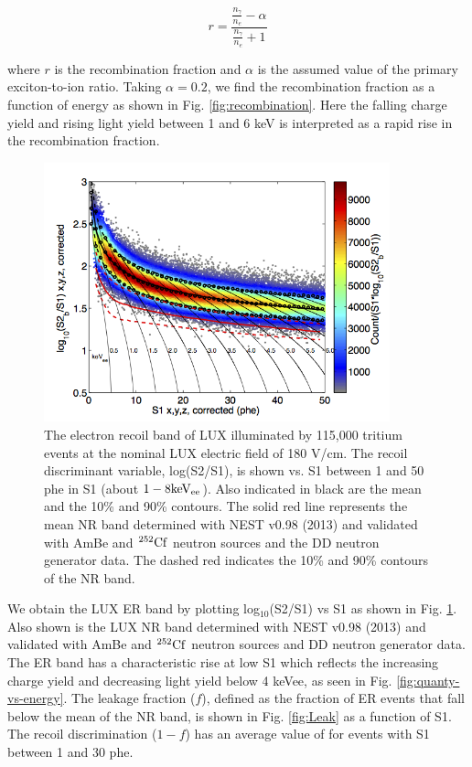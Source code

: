 \begin{displaymath}
r = \frac{\frac{n_{\gamma}}{n_e} - \alpha}{\frac{n_{\gamma}}{n_e} + 1}
\end{displaymath}

\noindent
where $r$ is the recombination fraction and $\alpha$ is the assumed value of the primary exciton-to-ion ratio. Taking $\alpha = 0.2$, we find the recombination fraction as a function of energy as shown in Fig. \ref{fig:recombination}. Here the falling charge yield and rising light yield between 1 and 6 keV is interpreted as a rapid rise in the recombination fraction. 


\begin{figure}[h!]\centering
\includegraphics[width=100mm]{fig/CH3T_fid_50_2_Dec_Tritium_Approval_Plots.png}
\caption{The electron recoil band of LUX illuminated by 115,000 tritium events at the nominal LUX electric field of 180 V/cm.  The recoil discriminant variable, log(S2/S1), is shown vs. S1 between 1 and 50 phe in S1 (about $\rm1-8 keV_{ee}$). Also indicated in black are the mean and the 10\% and 90\% contours. The solid red line represents the mean NR band determined with NEST v0.98 (2013) \cite{nest} and validated with AmBe and $\rm^{252}Cf$ neutron sources and the DD neutron generator data. The dashed red indicates the 10\% and 90\% contours of the NR band.}
\label{fig:ER_band}
\end{figure}

We obtain the LUX ER band by plotting log$_{10}$(S2/S1) vs S1 as shown in Fig. \ref{fig:ER_band}. Also shown is the LUX NR band determined with NEST v0.98 (2013) \cite{nest} and validated with AmBe and $\rm^{252}Cf$ neutron sources and DD neutron generator data. The ER band has a characteristic rise at low S1 which reflects the increasing charge yield and decreasing light yield below 4 keVee, as seen in Fig. \ref{fig:quanty-vs-energy}. The leakage fraction ($f$), defined as the fraction of ER events that fall below the mean of the NR band, is shown in Fig. \ref{fig:Leak} as a function of S1. The recoil discrimination ($1-f$) has an average value of  for events with S1 between 1 and 30 phe.



